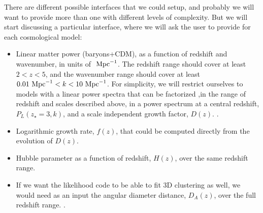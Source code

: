 There are different possible interfaces that we could setup, and probably 
we will want to provide more than one with different levels of complexity.
But we will start discussing a particular interface, where we will ask 
the user to provide for each cosmological model:
\begin{itemize}
 \item Linear matter power (baryons+CDM), as a function of redshift and 
  wavenumber, in units of $\ \text{Mpc}^{-1}$. 
  The redshift range should cover at least $2 < z < 5$, and the wavenumber
  range should cover at least $0.01 \ \text{Mpc}^{-1} < k < 10 \ \text{Mpc}^{-1}$. 
  For simplicity, we will restrict ourselves to models with a linear power 
  spectra that can be factorized ,in the range of redshift and scales 
  described above, in a power spectrum at a central redshift, 
  $P_L(z_\star=3,k)$, and a scale independent growth factor, $D(z)$.
  .
 \item Logarithmic growth rate, $f(z)$, that could be computed directly
  from the evolution of $D(z)$.
 \item Hubble parameter as a function of redshift, $H(z)$, over the same 
  redshift range.
 \item If we want the likelihood code to be able to fit 3D clustering as well,
  we would need as an input the angular diameter distance, $D_A(z)$, 
  over the full redshift range. .
\end{itemize}

